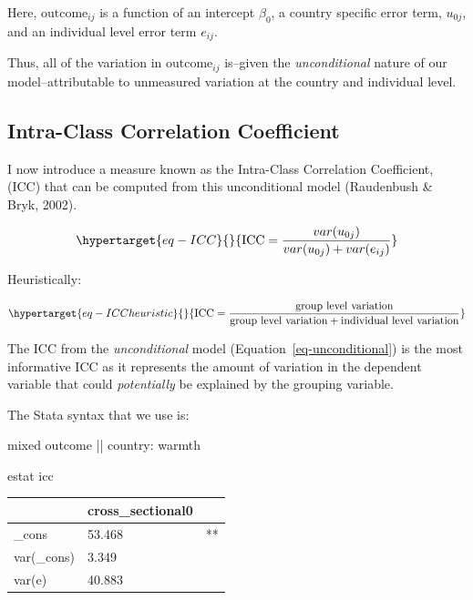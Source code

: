 \documentclass[
  letterpaper,
  DIV=11,
  numbers=noendperiod]{scrreprt}
\newenvironment{Shaded}{\begin{snugshade}}{\end{snugshade}}
\newcommand{\KeywordTok}[1]{\textcolor[rgb]{0.00,0.23,0.31}{#1}}
\newcommand{\NormalTok}[1]{\textcolor[rgb]{0.00,0.23,0.31}{#1}}
\begin{document}
Here, \(\text{outcome}_{ij}\) is a function of an intercept \(\beta_0\),
a country specific error term, \(u_{0j}\), and an individual level error
term \(e_{ij}\).

Thus, all of the variation in \(\text{outcome}_{ij}\) is--given the
\emph{unconditional} nature of our model--attributable to unmeasured
variation at the country and individual level.

\hypertarget{sec-ICC}{%
\subsection{Intra-Class Correlation Coefficient}\label{sec-ICC}}

I now introduce a measure known as the Intra-Class Correlation
Coefficient, (ICC) that can be computed from this unconditional model
(Raudenbush \& Bryk, 2002).

\begin{equation}\protect\hypertarget{eq-ICC}{}{\text{ICC} = \frac{var(u_{0j})}{var(u_{0j}) + var(e_{ij})}}\label{eq-ICC}\end{equation}

Heuristically:

\begin{equation}\protect\hypertarget{eq-ICCheuristic}{}{\text{ICC} = \frac{\text{group level variation}}{\text{group level variation} + \text{individual level variation}}}\label{eq-ICCheuristic}\end{equation}

The ICC from the \emph{unconditional} model
(Equation~\ref{eq-unconditional}) is the most informative ICC as it
represents the amount of variation in the dependent variable that could
\emph{potentially} be explained by the grouping variable.

The Stata syntax that we use is:

\begin{Shaded}
\begin{Highlighting}[]

\NormalTok{mixed outcome || country: warmth}

\KeywordTok{estat}\NormalTok{ icc}
\end{Highlighting}
\end{Shaded}

\begin{longtable}[]{@{}lll@{}}
\toprule\noalign{}
& cross\_sectional0 & \\
\midrule\noalign{}
\endhead
\bottomrule\noalign{}
\endlastfoot
\_cons & 53.468 & ** \\
var(\_cons) & 3.349 & \\
var(e) & 40.883 & \\
\end{longtable}
\end{document}
